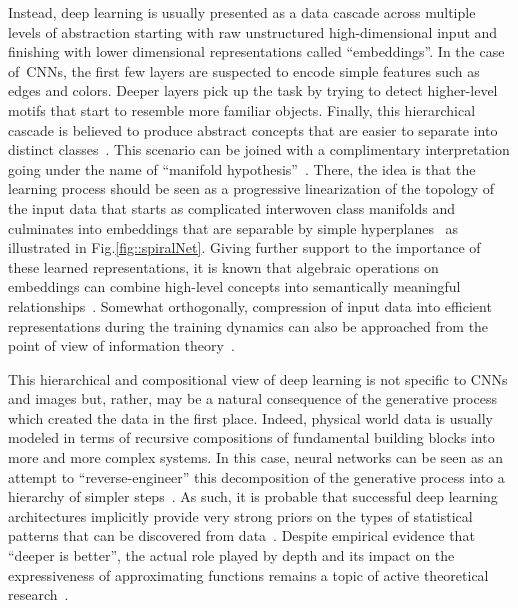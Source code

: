\documentclass{article}
\begin{document}
\noindent Instead, deep learning is usually presented as a data cascade across multiple levels of abstraction starting with raw unstructured high-dimensional input and finishing with lower dimensional representations called ``embeddings''.  In the case of~CNNs, the first few layers are suspected to encode simple features such as edges and colors.  Deeper layers pick up the task by trying to detect higher-level motifs that start to resemble more familiar objects.  Finally, this hierarchical cascade is believed to produce abstract concepts that are easier to separate into distinct classes~\cite{deconv}.  This scenario can be joined with a complimentary interpretation going under the name of ``manifold hypothesis''~\cite{manifoldHypothesis}.  There, the idea is that the learning process should be seen as a progressive linearization of the topology of the input data that starts as complicated interwoven class manifolds and culminates into embeddings that are separable by simple hyperplanes~\cite{chrisTopo,laurentSpiral} as illustrated in Fig.\ref{fig::spiralNet}.  Giving further support to the importance of these learned representations, it is known that algebraic operations on embeddings can combine high-level concepts into semantically meaningful relationships~\cite{DCGAN,mikolov}.  Somewhat orthogonally, compression of input data into efficient representations during the training dynamics can also be approached from the point of view of information theory~\cite{tishby}.

\newpage

\noindent This hierarchical and compositional view of deep learning is not specific to CNNs and images but, rather, may be a natural consequence of the generative process which created the data in the first place.  Indeed, physical world data is usually modeled in terms of recursive compositions of fundamental building blocks into more and more complex systems. In this case, neural networks can be seen as an attempt to ``reverse-engineer'' this decomposition of the generative process into a hierarchy of simpler steps~\cite{cheapLearning}.  As such, it is probable that successful deep learning architectures implicitly provide very strong priors on the types of statistical patterns that can be discovered from data~\cite{explainMethod}.  Despite empirical evidence that ``deeper is better'', the actual role played by depth and its impact on the expressiveness of approximating functions remains a topic of active theoretical research~\cite{nadav,poggio}. \\
\end{document}
